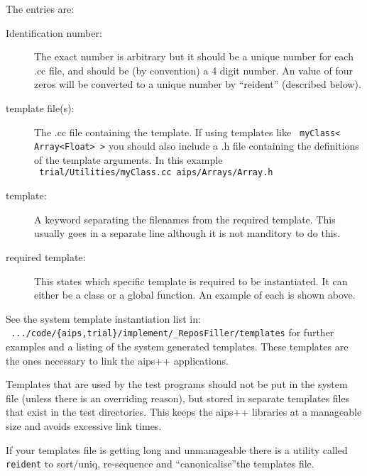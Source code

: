 The entries are:
\begin{description}
\item[Identification number:] The exact number is arbitrary but it
  should be a unique number for each .cc file, and should be (by
  convention) a 4 digit number. An value of four zeros will be
  converted to a unique number by ``reident'' (described below).
\item[template file(s):] The .cc file containing the template. If using
  templates like \texttt{ myClass< Array<Float> >} you should also
  include a .h file containing the definitions of the
  template arguments. In this example \\
  \texttt{ trial/Utilities/myClass.cc aips/Arrays/Array.h}
\item[template:] A keyword separating the filenames from the required
  template. This usually goes in a separate line although it is not
  manditory to do this.
\item[required template:] This states which specific template is required
  to be instantiated. It can either be a class or a global
  function. An example of each is shown above. 
\end{description}
See the system template instantiation list in: \\
\texttt{ .../code/\{aips,trial\}/implement/\_ReposFiller/templates} 
for further examples and a listing of the system generated 
templates. These templates are the ones necessary to link the aips++
applications.

Templates that are used by the test programs should not be put in the
system file (unless there is an overriding reason), but stored in
separate templates files that exist in the test directories. This keeps
the aips++ libraries at a manageable size and avoids excessive link
times. 

If your templates file is getting long and unmanageable there is a
utility called \texttt{reident} to sort/uniq, re-sequence and
``canonicalise''the templates file.

